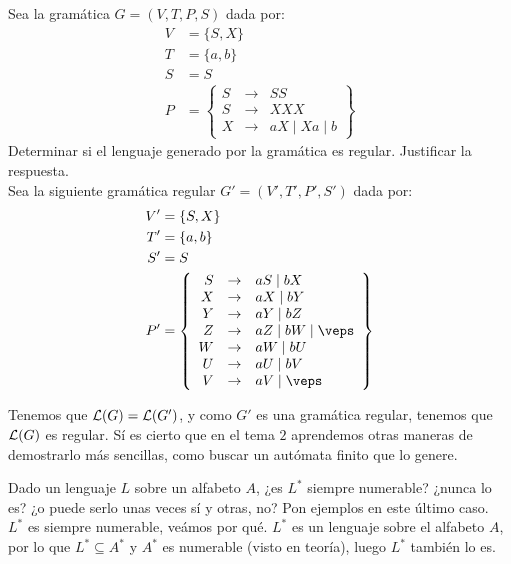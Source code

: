 \begin{ejercicio}
    Sea la gramática $G=\left(V,T,P,S\right)$ dada por:
    \begin{align*}
        V &= \{S, X\} \\
        T &= \{a,b\} \\
        S &= S\\
        P &= \left\{
            \begin{array}{rcl}
                S &\rightarrow & SS \\
                S &\rightarrow & XXX \\
                X &\rightarrow & aX \mid Xa \mid b
            \end{array}
        \right\}
    \end{align*}
    Determinar si el lenguaje generado por la gramática es regular. Justificar la respuesta.\\

    Sea la siguiente gramática regular $G'=\left(V',T',P',S'\right)$ dada por:
    \begin{align*}
        V' &= \{S, X\} \\
        T' &= \{a,b\} \\
        S' &= S \\
        P' &= \left\{
            \begin{array}{rcl}
                S &\rightarrow & aS \mid bX \\
                X &\rightarrow & aX \mid bY \\
                Y &\rightarrow & aY \mid bZ \\
                Z &\rightarrow & aZ \mid bW \mid \veps \\
                W &\rightarrow & aW \mid bU \\
                U &\rightarrow & aU \mid bV \\
                V &\rightarrow & aV \mid \veps
            \end{array}
        \right\}
    \end{align*}

    Tenemos que $\mathcal{L}(G) = \mathcal{L}(G')$, y como $G'$ es una gramática regular, tenemos que $\mathcal{L}(G)$ es regular.
    Sí es cierto que en el tema $2$ aprendemos otras maneras de demostrarlo más sencillas, como buscar un autómata finito que lo genere.
\end{ejercicio}

\begin{ejercicio}
    Dado un lenguaje $L$ sobre un alfabeto $A$, ¿es $L^{\ast}$ siempre numerable? ¿nunca lo es? ¿o puede serlo unas veces sí y otras, no? Pon ejemplos en este último caso.\\

    $L^{\ast}$ es siempre numerable, veámos por qué. $L^{\ast}$ es un lenguaje sobre el alfabeto $A$, por lo que $L^{\ast}\subseteq A^{\ast}$ y $A^{\ast}$ es numerable (visto en teoría), luego $L^{\ast}$ también lo es.
\end{ejercicio}

